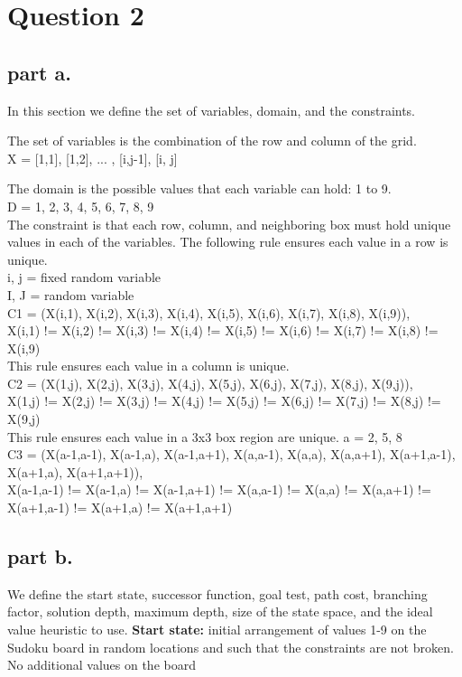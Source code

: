 \section{Question 2}

\subsection{part a.}
In this section we define the set of variables, domain, and the constraints.

The set of variables is the combination of the row and column of the grid. \\
X = {[1,1], [1,2], ... , [i,j-1], [i, j]}

The domain is the possible values that each variable can hold: 1 to 9.\\
D = {1, 2, 3, 4, 5, 6, 7, 8, 9} \\

The constraint is that each row, column, and neighboring box must hold unique values in each of the variables. The following rule ensures each value in a row is unique. \\
i, j = fixed random variable \\
I, J = random variable \\
C1 = {(X(i,1), X(i,2), X(i,3), X(i,4), X(i,5), X(i,6), X(i,7), X(i,8), X(i,9)),\\
	{X(i,1) != X(i,2) != X(i,3) != X(i,4) != X(i,5) != X(i,6) != X(i,7) != X(i,8) != X(i,9)}}\\


This rule ensures each value in a column is unique. \\
C2 = {(X(1,j), X(2,j), X(3,j), X(4,j), X(5,j), X(6,j), X(7,j), X(8,j), X(9,j)), \\
{X(1,j) != X(2,j) != X(3,j) != X(4,j) != X(5,j) != X(6,j) != X(7,j) != X(8,j) != X(9,j)}}\\


This rule ensures each value in a 3x3 box region are unique.
a = 2, 5, 8 \\
C3 = {(X(a-1,a-1), X(a-1,a), X(a-1,a+1), X(a,a-1), X(a,a), X(a,a+1), X(a+1,a-1), X(a+1,a), X(a+1,a+1)), \\
	{X(a-1,a-1) != X(a-1,a) != X(a-1,a+1) != X(a,a-1) != X(a,a) != X(a,a+1) != X(a+1,a-1) != X(a+1,a) != X(a+1,a+1)}}\\


\subsection{part b.}
We define the start state, successor function, goal test, path cost,  branching factor, solution depth, maximum depth, size of the state space, and the ideal value heuristic to use.
\textbf{Start state:} initial arrangement of values 1-9 on the Sudoku board in random locations and such that the constraints are not broken. No additional values on the board\\

